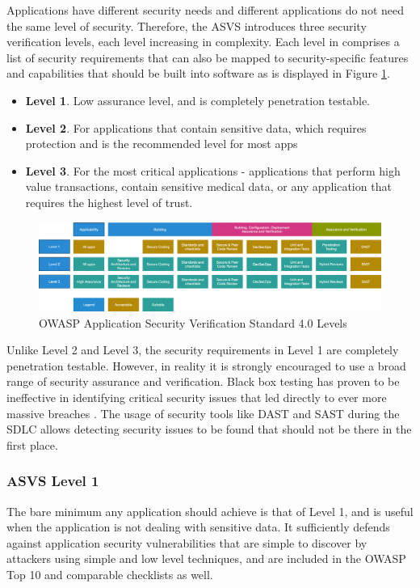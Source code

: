 Applications have different security needs and different applications do not need the same level of security. Therefore, the ASVS introduces three security verification levels, each level increasing in complexity. Each level in comprises a list of security requirements that can also be mapped to security-specific features and capabilities that should be built into software as is displayed in Figure \ref{fig:asvs-levels}.
\begin{itemize}
    \item \textbf{Level 1}. Low assurance level, and is completely penetration testable.
    \item \textbf{Level 2}. For applications that contain sensitive data, which requires protection and is the recommended level for most apps
    \item \textbf{Level 3}. For the most critical applications - applications that perform high value transactions, contain sensitive medical data, or any application that requires the highest level of trust.
\end{itemize}
\begin{figure}[!h]
    \centering
    \includegraphics[width=\textwidth]{../../img/chapter_2/owasp-asvs-levels.png}
    \caption{OWASP Application Security Verification Standard 4.0 Levels}
    \label{fig:asvs-levels}
\end{figure}
Unlike Level 2 and Level 3, the security requirements in Level 1 are completely penetration testable. However, in reality it is strongly encouraged to use a broad range of security assurance and verification. Black box testing has proven to be ineffective in identifying critical security issues that led directly to ever more massive breaches \cite{owasp_about}. The usage of security tools like DAST and SAST during the SDLC allows detecting security issues to be found that should not be there in the first place.

\subsubsection{ASVS Level 1}
The bare minimum any application should achieve is that of Level 1, and is useful when the application is not dealing with sensitive data. It sufficiently defends against application security vulnerabilities that are simple to discover by attackers using simple and low level techniques, and are included in the OWASP Top 10 and comparable checklists as well.

